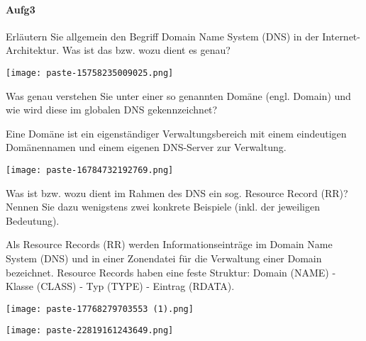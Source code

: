 \documentclass{article}
\begin{document}
\paragraph{Aufg3}
\begin{tcolorbox}[colback=white!10!white,colframe=lightgray!75!black,
  savelowerto=\jobname_ex.tex,breakable,enhanced,lines before break=40]

\justifying
Erläutern Sie allgemein den Begriff Domain Name System (DNS) in der Internet-Architektur. Was ist das bzw. wozu dient es genau?

\tcblower

\justifying
\begin{center}
\texttt{[image: paste-15758235009025.png]}
\end{center}

\end{tcolorbox}
\begin{tcolorbox}[colback=white!10!white,colframe=lightgray!75!black,
  savelowerto=\jobname_ex.tex,breakable,enhanced,lines before break=40]

\justifying
Was genau verstehen Sie unter einer so genannten Domäne (engl. Domain) und wie wird diese im globalen DNS gekennzeichnet?

\tcblower

\justifying
Eine Domäne ist ein eigenständiger Verwaltungsbereich mit einem eindeutigen Domänennamen und einem eigenen DNS-Server zur Verwaltung.\begin{center}
\texttt{[image: paste-16784732192769.png]}
\end{center}

\end{tcolorbox}
\begin{tcolorbox}[colback=white!10!white,colframe=lightgray!75!black,
  savelowerto=\jobname_ex.tex,breakable,enhanced,lines before break=40]

\justifying
Was ist bzw. wozu dient im Rahmen des DNS ein sog. Resource Record (RR)? Nennen Sie dazu wenigstens zwei konkrete Beispiele (inkl. der jeweiligen Bedeutung).

\tcblower

\justifying
Als Resource Records (RR) werden Informationseinträge im Domain Name System (DNS) und in einer Zonendatei für die Verwaltung einer Domain bezeichnet. Resource Records haben eine feste Struktur: Domain (NAME) - Klasse (CLASS) - Typ (TYPE) - Eintrag (RDATA).\begin{center}
\texttt{[image: paste-17768279703553 (1).png]}
\end{center}
\begin{center}
\texttt{[image: paste-22819161243649.png]}
\end{center}

\end{tcolorbox}
\end{document}
